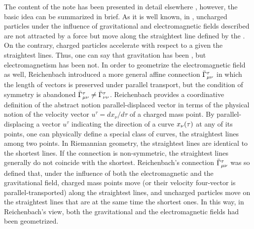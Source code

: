 \documentclass[draft]{article}
\newcommand{\ap}{\ensuremath{\tau}\xspace}
\newcommand{\dap}{\ensuremath{d\ap}\xspace}
\newcommand{\Gtmnbar}{\ensuremath{\bar{\Gamma}\tmn}\xspace}
\begin{document}
The content of the note has been presented in detail elsewhere \citep{Giovanelli2016}, however, the basic idea can be summarized in brief. As it is well known, in \gr, uncharged particles under the influence of gravitational and electromagnetic fields described are not attracted by a force but move along the straightest line defined by the \Gtmn. On the contrary, charged particles accelerate with respect to a given the straightest lines. Thus, one can say that gravitation has been , but electromagnetism has been not. In order to geometrize the electromagnetic field as well, Reichenbach introduced a more general affine connection \Gtmnbar in which the length of vectors is preserved under parallel transport, but the condition of symmetry is abandoned $\Gtmnbar \neq \bar{\Gamma}^\tau_{\nu\nu}$. Reichenbach provides a coordinative definition of the abstract notion parallel-displaced vector in terms of the physical notion of the velocity vector $u^\tau=dx_\nu/\dap$ of a charged mass point. By parallel-displacing a vector $u^\tau$ indicating the direction of a curve $\xn(\ap)$ at any of its points, one can physically define a special class of curves, the straightest lines among two points. In Riemannian geometry, the straightest lines are identical to the shortest lines. If the connection is non-symmetric, the straightest lines generally do not coincide with the shortest. Reichenbach's connection \Gtmnbar was so defined that, under the influence of both the electromagnetic and the gravitational field, charged mass points move (or their velocity four-vector is parallel-transported) along the straightest lines, and uncharged particles move on the straightest lines that are at the same time the shortest ones. In this way, in Reichenbach's view, both the gravitational and the electromagnetic fields had been geometrized.

\end{document}
